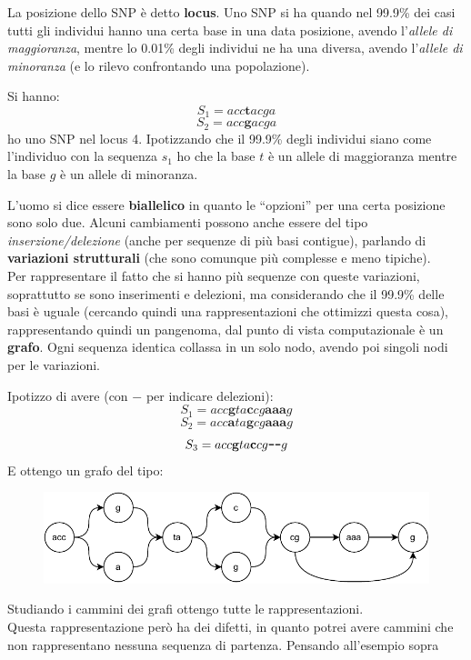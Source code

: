 \documentclass[a4paper,12pt, oneside]{book}
\begin{document}
La posizione dello SNP è detto \textbf{locus}. Uno SNP si ha quando nel 99.9\%
dei casi tutti gli individui hanno una certa base in una data posizione, avendo
l'\textit{allele di maggioranza}, mentre lo 0.01\% degli individui ne ha una
diversa, avendo l'\textit{allele di minoranza} (e lo rilevo confrontando una
popolazione). 
\begin{esempio}
  Si hanno:
  \[S_1=acc\mathbf{t}acga\]
  \[S_2=acc\mathbf{g}acga\]
  ho uno SNP nel locus 4.
  Ipotizzando che il 99.9\% degli individui siano come l'individuo con la
  sequenza $s_1$ ho che la base $t$ è un allele di maggioranza mentre la base
  $g$ è un allele di minoranza.
\end{esempio}
L'uomo si dice essere \textbf{biallelico} in quanto le ``opzioni'' per una certa
posizione sono solo due. Alcuni cambiamenti possono anche essere del tipo
\textit{inserzione/delezione} (anche per sequenze di più basi contigue),
parlando di \textbf{variazioni strutturali} (che sono comunque più complesse e
meno tipiche).\\
Per rappresentare il fatto che si hanno più sequenze con queste variazioni,
soprattutto se sono inserimenti e delezioni, ma considerando che il 99.9\% delle
basi è uguale (cercando quindi una rappresentazioni che ottimizzi questa cosa),
rappresentando quindi un pangenoma, dal punto di vista computazionale è un
\textbf{grafo}. Ogni sequenza identica collassa in un solo nodo, avendo poi
singoli nodi per le variazioni.
\begin{esempio}
  Ipotizzo di avere (con $-$ per indicare delezioni):
  \[S_1=acc\mathbf{g}ta\mathbf{c}cg\mathbf{aaa}g\]
  \[S_2=acc\mathbf{a}ta\mathbf{g}cg\mathbf{aaa}g\]
  \[S_3=acc\mathbf{g}ta\mathbf{c}cg\mbox{\textbf{\texttt{---}}}g\]
  E ottengo un grafo del tipo:
  \begin{figure}[H]
    \centering
    \includegraphics[width=\textwidth]{img/gra.pdf}
  \end{figure}
\end{esempio}
Studiando i cammini dei grafi ottengo tutte le rappresentazioni.\\
Questa rappresentazione però ha dei difetti, in quanto potrei avere cammini che
non rappresentano nessuna sequenza di partenza. Pensando all'esempio sopra
\end{document}
